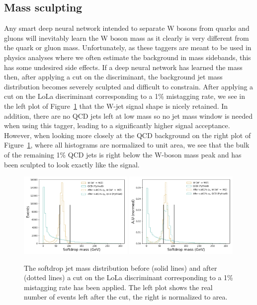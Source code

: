\subsection{Mass sculpting}
\label{sec:lola:massculpting}
Any smart deep neural network intended to separate W bosons from quarks and gluons will inevitably learn the W boson mass as it clearly is very different from the quark or gluon mass. Unfortunately, as these taggers are meant to be used in physics analyses where we often estimate the background in mass sidebands, this has some undesired side effects. If a deep neural network has learned the mass then, after applying a cut on the discriminant, the background jet mass distribution becomes severely sculpted and difficult to constrain. \newline
After applying a cut on the LoLa discriminant corresponding to a 1\% mistagging rate, we see in the left plot of Figure~\ref{fig:lola:masssculpt} that the W-jet signal shape is nicely retained. In addition, there are no QCD jets left at low mass so no jet mass window is needed when using this tagger, leading to a significantly higher signal acceptance. However, when looking more closely at 
the QCD background on the right plot of Figure~\ref{fig:lola:masssculpt}, where all histograms are normalized to unit area, we see that the bulk of the remaining 1\% QCD jets is right below the W-boson mass peak and has been sculpted to look exactly like the signal.
\begin{figure}[h!]
\centering
\includegraphics[width=0.49\textwidth]{figures/vtagging/lola/wLola_v6_500rew-mass-afterCut-sigprob_wLola_v6_500rew.png}
\includegraphics[width=0.49\textwidth]{figures/vtagging/lola/wLola_v6_500rew-mass-afterCut-sigprob_wLola_v6_500rew_normed.png}
\caption{The softdrop jet mass distribution before (solid lines) and after (dotted lines) a cut on the LoLa discriminant corresponding to a 1\% mistagging rate has been applied. The left plot shows the real number of events left after the cut, the right is normalized to area.}
\label{fig:lola:masssculpt}
\end{figure}

